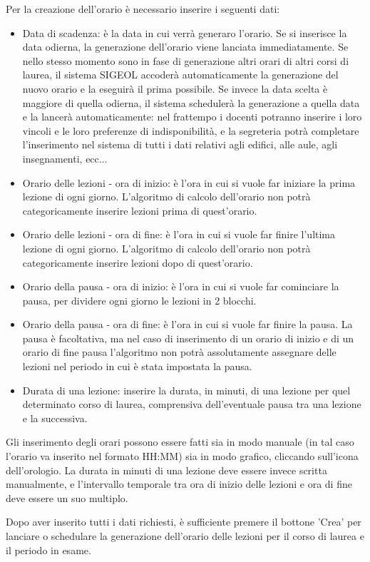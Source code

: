 \documentclass[11pt,a4paper]{article}
\begin{document}
Per la creazione dell'orario è necessario inserire i seguenti dati:
\begin{itemize}
 \item Data di scadenza: è la data in cui verrà generaro l'orario. Se si inserisce la data odierna, la generazione dell'orario viene lanciata immediatamente. Se nello stesso momento sono in fase di generazione altri orari di altri corsi di laurea, il sistema SIGEOL accoderà automaticamente la generazione del nuovo orario e la eseguirà il prima possibile. Se invece la data scelta è maggiore di quella odierna, il sistema schedulerà la generazione a quella data e la lancerà automaticamente: nel frattempo i docenti potranno inserire i loro vincoli e le loro preferenze di indisponibilità, e la segreteria potrà completare l'inserimento nel sistema di tutti i dati relativi agli edifici, alle aule, agli insegnamenti, ecc...
 \item Orario delle lezioni - ora di inizio: è l'ora in cui si vuole far iniziare la prima lezione di ogni giorno. L'algoritmo di calcolo dell'orario non potrà categoricamente inserire lezioni prima di quest'orario.
 \item Orario delle lezioni - ora di fine: è l'ora in cui si vuole far finire l'ultima lezione di ogni giorno. L'algoritmo di calcolo dell'orario non potrà categoricamente inserire lezioni dopo di quest'orario.
 \item Orario della pausa - ora di inizio: è l'ora in cui si vuole far cominciare la pausa, per dividere ogni giorno le lezioni in 2 blocchi.
 \item Orario della pausa - ora di fine: è l'ora in cui si vuole far finire la pausa. La pausa è facoltativa, ma nel caso di inserimento di un orario di inizio e di un orario di fine pausa l'algoritmo non potrà assolutamente assegnare delle lezioni nel periodo in cui è stata impostata la pausa.
 \item Durata di una lezione: inserire la durata, in minuti, di una lezione per quel determinato corso di laurea, comprensiva dell'eventuale pausa tra una lezione e la successiva.
\end{itemize}
Gli inserimento degli orari possono essere fatti sia in modo manuale (in tal caso l'orario va inserito nel formato HH:MM) sia in modo grafico, cliccando sull'icona dell'orologio.
La durata in minuti di una lezione deve essere invece scritta manualmente, e l'intervallo temporale tra ora di inizio delle lezioni e ora di fine deve essere un suo multiplo.

Dopo aver inserito tutti i dati richiesti, è sufficiente premere il bottone 'Crea' per lanciare o schedulare la generazione dell'orario delle lezioni per il corso di laurea e il periodo in esame.
\end{document}
